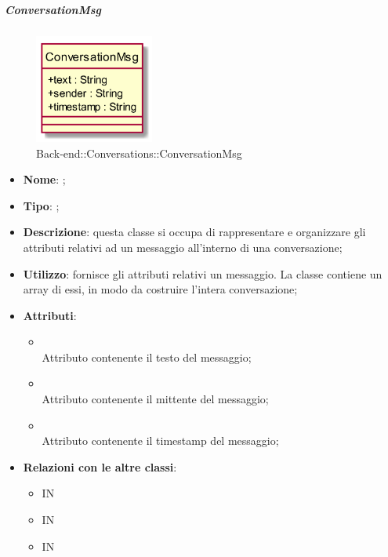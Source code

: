 \hypertarget{ConversationMsg_label}{\subparagraph{ConversationMsg}}
\begin{figure}[h]
	\centering
	\includegraphics[width=0.35\textwidth,height=\textheight,keepaspectratio]{images/ClassConversationMsg.png}
	\caption{Back-end::Conversations::ConversationMsg}
\end{figure}
\begin{itemize}
	\item \textbf{Nome}: ;
	\item \textbf{Tipo}: ;
	\item \textbf{Descrizione}: questa classe si occupa di rappresentare e organizzare gli attributi relativi ad un messaggio all'interno di una conversazione;
	\item \textbf{Utilizzo}: fornisce gli attributi relativi un messaggio. La classe  contiene un array di essi, in modo da costruire l'intera conversazione;
	\item \textbf{Attributi}:
	\begin{itemize}
		\item[]  \\
		Attributo contenente il testo del messaggio;
		\item[]  \\
		Attributo contenente il mittente del messaggio;
		\item[]  \\
		Attributo contenente il timestamp del messaggio;
	\end{itemize}
	\item \textbf{Relazioni con le altre classi}:
	\begin{itemize}
		\item IN \hyperlink{Conversation_label}{}
		\item IN \hyperlink{<<interface>> ConversationsDAO_label}{}
		\item IN \hyperlink{ConversationsDAODynamoDB_label}{}
	\end{itemize}
\end{itemize}
\FloatBarrier


